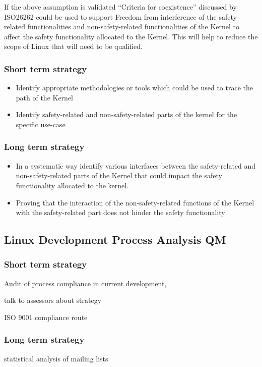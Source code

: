 \documentclass[12pt]{ElisaPaper}
\begin{document}
If the above assumption is validated “Criteria for coexistence” discussed by ISO26262 could be used to support Freedom from interference of the safety-related functionalities and non-safety-related functionalities of the Kernel to affect the safety functionality allocated to the Kernel. 
This will help to reduce the scope of Linux that will need to be qualified.

\subsubsection{Short term strategy}
\begin{itemize}
	\item	Identify appropriate methodologies or tools which could be used to trace the path of the Kernel 
	\item	Identify safety-related and non-safety-related parts of the kernel for the specific use-case
\end{itemize}
\subsubsection{Long term strategy}
\begin{itemize}
\item	In a systematic way identify various interfaces between the safety-related and non-safety-related parts of the Kernel that could impact the safety functionality allocated to the kernel.
\item	Proving that the interaction of the non-safety-related functions of the Kernel with the safety-related part does not hinder the safety functionality
\end{itemize}

\subsection{Linux Development Process Analysis QM}

\subsubsection{Short term strategy}
Audit of process compliance in current development, 

talk to assessors about strategy

ISO 9001 compliance route

\subsubsection{Long term strategy}
statistical analysis of mailing lists
\end{document}
